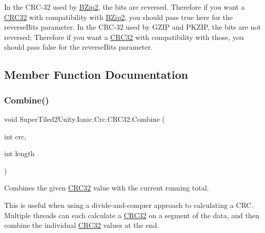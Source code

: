 In the C\+R\+C-\/32 used by \mbox{\hyperlink{namespace_super_tiled2_unity_1_1_ionic_1_1_b_zip2}{B\+Zip2}}, the bits are reversed. Therefore if you want a \mbox{\hyperlink{class_super_tiled2_unity_1_1_ionic_1_1_crc_1_1_c_r_c32}{C\+R\+C32}} with compatibility with \mbox{\hyperlink{namespace_super_tiled2_unity_1_1_ionic_1_1_b_zip2}{B\+Zip2}}, you should pass true here for the {\ttfamily reverse\+Bits} parameter. In the C\+R\+C-\/32 used by G\+Z\+IP and P\+K\+Z\+IP, the bits are not reversed; Therefore if you want a \mbox{\hyperlink{class_super_tiled2_unity_1_1_ionic_1_1_crc_1_1_c_r_c32}{C\+R\+C32}} with compatibility with those, you should pass false for the {\ttfamily reverse\+Bits} parameter. 

\subsection{Member Function Documentation}
\mbox{\label{class_super_tiled2_unity_1_1_ionic_1_1_crc_1_1_c_r_c32_a947f4c65cbeb6d2deae11477b0c18893}} 
\subsubsection{\texorpdfstring{Combine()}{Combine()}}
{\footnotesize\ttfamily void Super\+Tiled2\+Unity.\+Ionic.\+Crc.\+C\+R\+C32.\+Combine (\begin{DoxyParamCaption}\item[{int}]{crc,  }\item[{int}]{length }\end{DoxyParamCaption})}



Combines the given \mbox{\hyperlink{class_super_tiled2_unity_1_1_ionic_1_1_crc_1_1_c_r_c32}{C\+R\+C32}} value with the current running total. 

This is useful when using a divide-\/and-\/conquer approach to calculating a C\+RC. Multiple threads can each calculate a \mbox{\hyperlink{class_super_tiled2_unity_1_1_ionic_1_1_crc_1_1_c_r_c32}{C\+R\+C32}} on a segment of the data, and then combine the individual \mbox{\hyperlink{class_super_tiled2_unity_1_1_ionic_1_1_crc_1_1_c_r_c32}{C\+R\+C32}} values at the end. 


